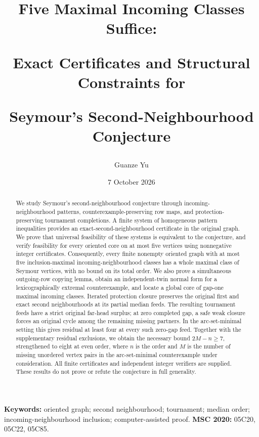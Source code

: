 \documentclass[11pt]{article}
\title{Five Maximal Incoming Classes Suffice:\par
Exact Certificates and Structural Constraints for\par
Seymour's Second-Neighbourhood Conjecture}
\author{Guanze Yu}
\date{7 October 2026}
\begin{document}
\maketitle
\begin{abstract}
We study Seymour's second-neighbourhood conjecture through incoming-neighbourhood
patterns, counterexample-preserving row maps, and protection-preserving tournament
completions. A finite system of homogeneous pattern inequalities provides an
exact-second-neighbourhood certificate in the original graph. We prove that
universal feasibility of these systems is equivalent to the conjecture, and
verify feasibility for every oriented core on at most five vertices using
nonnegative integer certificates. Consequently, every finite nonempty oriented graph
with at most five inclusion-maximal incoming-neighbourhood classes has a whole
maximal class of Seymour vertices, with no bound on its total order.
We also prove a simultaneous outgoing-row copying lemma, obtain an independent-twin
normal form for a lexicographically extremal counterexample, and locate a global
core of gap-one maximal incoming classes. Iterated protection closure preserves
the original first and exact second neighbourhoods at its partial median feeds.
The resulting tournament feeds have a strict original far-head surplus; at zero
completed gap, a safe weak closure forces an original cycle among the remaining
missing partners. In the arc-set-minimal setting this gives residual at least four
at every such zero-gap feed. Together with the supplementary residual exclusions,
we obtain the necessary bound $2M-n\ge7$, strengthened to eight at even order,
where $n$ is the order and $M$ is the number of missing unordered vertex pairs
in the arc-set-minimal counterexample under consideration.
All finite certificates and independent integer verifiers are supplied. These
results do not prove or refute the conjecture in full generality.
\end{abstract}
\noindent\textbf{Keywords:} oriented graph; second neighbourhood; tournament;
median order; incoming-neighbourhood inclusion; computer-assisted proof.
\medskip
\noindent\textbf{MSC 2020:} 05C20, 05C22, 05C85.










\end{document}

